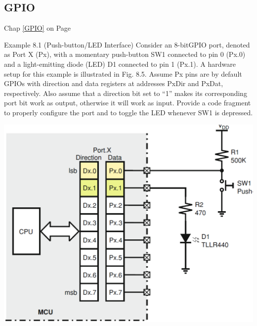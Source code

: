 \subsection{GPIO}
Chap \ref{GPIO} on Page \pageref{GPIO}\\
\begin{minipage}{0.5\linewidth}
    Example 8.1 (Push-button/LED Interface) Consider an 8-bitGPIO port, denoted
    as Port X (Px), with a momentary push-button SW1 connected to pin 0 (Px.0) and a
    light-emitting diode (LED) D1 connected to pin 1 (Px.1). A hardware setup for this
    example is illustrated in Fig. 8.5. Assume Px pins are by default GPIOs with direction
    and data registers at addresses PxDir and PxDat, respectively. Also assume that a
    direction bit set to “1” makes its corresponding port bit work as output, otherwise
    it will work as input. Provide a code fragment to properly configure the port and to
    toggle the LED whenever SW1 is depressed.
\end{minipage}
\begin{minipage}{0.5\linewidth}
    \includegraphics[width=\linewidth]{images/GPIOBsp}
\end{minipage}



